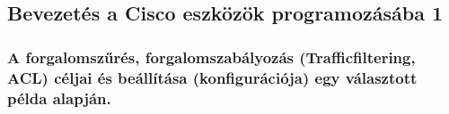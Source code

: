 \subsection{Bevezetés a Cisco eszközök programozásába 1}
\subsubsection{A forgalomszűrés, forgalomszabályozás (Trafficfiltering, ACL) céljai és beállítása (konfigurációja) egy választott példa alapján.}